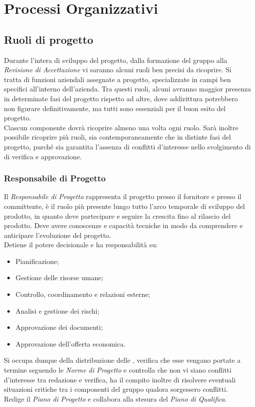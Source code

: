 \documentclass{scalatekids-article}
\begin{document}
\section{Processi Organizzativi}
\subsection{Ruoli di progetto}
Durante l'intera  di sviluppo del progetto, dalla formazione del gruppo alla
\textit{Revisione di Accettazione} vi saranno alcuni ruoli ben precisi da ricoprire. Si
tratta di funzioni aziendali assegnate a progetto, specializzate in campi ben
specifici all'interno dell'azienda. Tra questi ruoli, alcuni avranno maggior
presenza in determinate fasi del progetto rispetto ad altre, dove addirittura
potrebbero non figurare definitivamente, ma tutti sono essenziali per il buon
esito del progetto.\\ Ciascun componente dovrà ricoprire almeno una volta ogni
ruolo. Sarà inoltre possibile ricoprire più ruoli, sia contemporaneamente che in
distinte fasi del progetto, purché sia garantita l'assenza di conflitti
d'interesse nello svolgimento di  di verifica e approvazione.
\subsubsection{Responsabile di Progetto}
Il \textit{Responsabile di Progetto} rappresenta il progetto presso il fornitore
e presso il committente, è il ruolo più presente lungo tutto l'arco temporale di
sviluppo del prodotto, in quanto deve partecipare e seguire la
crescita fino al rilascio del prodotto. Deve avere conoscenze e capacità
tecniche in modo da comprendere e anticipare l'evoluzione del progetto.\\
Detiene il potere decisionale e ha responsabilità su:
\begin{itemize}
\item Pianificazione;
\item Gestione delle risorse umane;
\item Controllo, coordinamento e relazioni esterne;
\item Analisi e gestione dei rischi;
\item Approvazione dei documenti;
\item Approvazione dell'offerta economica.
\end{itemize}
Si occupa dunque della distribuzione delle , verifica che esse vengano
portate a termine seguendo le \textit{Norme di Progetto} e controlla che non vi
siano conflitti d'interesse tra redazione e verifica, ha il compito inoltre di
risolvere eventuali situazioni critiche tra i componenti del gruppo qualora
sorgessero conflitti.\\ Redige il \textit{Piano di Progetto} e collabora alla
stesura del \textit{Piano di Qualifica}.
\end{document}
